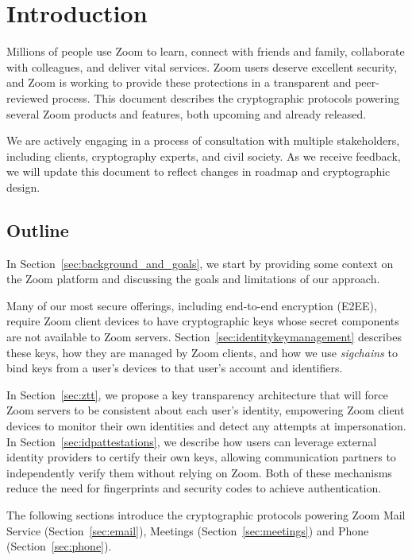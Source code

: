 \section{Introduction}
Millions of people use Zoom to learn, connect with friends and family, collaborate with colleagues,
and deliver vital services. Zoom users deserve excellent security, and Zoom is working to provide
these protections in a transparent and peer-reviewed process. This document describes the
cryptographic protocols powering several Zoom products and features, both upcoming and already
released.

We are actively engaging in a process of consultation with multiple stakeholders, including clients,
cryptography experts, and civil society. As we receive feedback, we will update this document to
reflect changes in roadmap and cryptographic design.

\subsection{Outline}

In Section~\ref{sec:background_and_goals}, we start by providing some context on the Zoom platform
and discussing the goals and limitations of our approach.

Many of our most secure offerings, including end-to-end encryption (E2EE), require Zoom client
devices to have cryptographic keys whose secret components are not available to Zoom servers.
Section~\ref{sec:identitykeymanagement} describes these keys, how they are managed by Zoom clients,
and how we use \textit{sigchains} to bind keys from a user's devices to that user's account and
identifiers.

In Section~\ref{sec:ztt}, we propose a key transparency architecture that will force Zoom servers to
be consistent about each user's identity, empowering Zoom client devices to monitor their own
identities and detect any attempts at impersonation. In Section~\ref{sec:idpattestations}, we
describe how users can leverage external identity providers to certify their own keys, allowing
communication partners to independently verify them without relying on Zoom. Both of these
mechanisms reduce the need for fingerprints and security codes to achieve authentication.

The following sections introduce the cryptographic protocols powering Zoom Mail Service
(Section~\ref{sec:email}), Meetings (Section~\ref{sec:meetings}) and Phone
(Section~\ref{sec:phone}).

